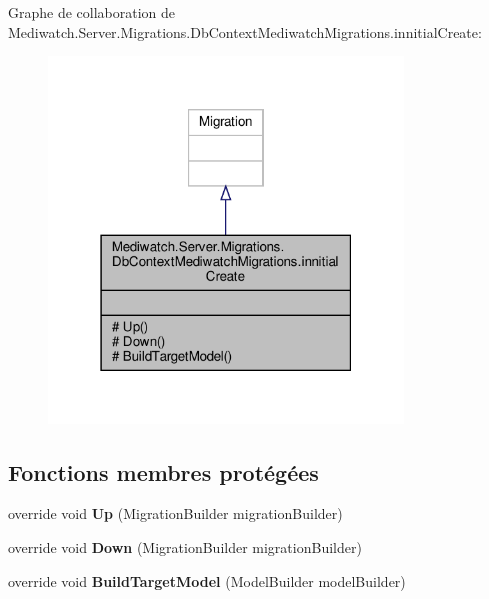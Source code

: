 Graphe de collaboration de Mediwatch.\+Server.\+Migrations.\+Db\+Context\+Mediwatch\+Migrations.\+innitial\+Create\+:\nopagebreak
\begin{figure}[H]
\begin{center}
\leavevmode
\includegraphics[width=267pt]{class_mediwatch_1_1_server_1_1_migrations_1_1_db_context_mediwatch_migrations_1_1innitial_create__coll__graph}
\end{center}
\end{figure}
\subsection*{Fonctions membres protégées}
\begin{DoxyCompactItemize}
\item 
\mbox{\label{class_mediwatch_1_1_server_1_1_migrations_1_1_db_context_mediwatch_migrations_1_1innitial_create_aef1f061d376a2cd1f4d24f3b3b4f06a0}} 
override void {\bfseries Up} (Migration\+Builder migration\+Builder)
\item 
\mbox{\label{class_mediwatch_1_1_server_1_1_migrations_1_1_db_context_mediwatch_migrations_1_1innitial_create_adf827587ad324f346db044e7e9409e0a}} 
override void {\bfseries Down} (Migration\+Builder migration\+Builder)
\item 
\mbox{\label{class_mediwatch_1_1_server_1_1_migrations_1_1_db_context_mediwatch_migrations_1_1innitial_create_a69982625d14eda9615db6ba5340dda49}} 
override void {\bfseries Build\+Target\+Model} (Model\+Builder model\+Builder)
\end{DoxyCompactItemize}


